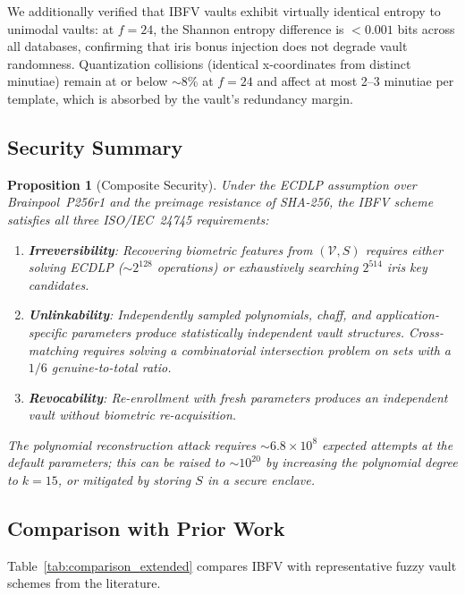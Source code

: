 \documentclass[3p,twocolumn]{elsarticle}
\newtheorem{proposition}{Proposition}
\newcommand{\IBFV}{\textsf{IBFV}}
\begin{document}
We additionally verified that \IBFV{} vaults exhibit virtually identical entropy to unimodal vaults: at $f = 24$, the Shannon entropy difference is $< 0.001$ bits across all databases, confirming that iris bonus injection does not degrade vault randomness. Quantization collisions (identical x-coordinates from distinct minutiae) remain at or below $\sim$8\% at $f = 24$ and affect at most 2--3 minutiae per template, which is absorbed by the vault's redundancy margin.

\subsection{Security Summary}
\label{sec:security_summary}

\begin{proposition}[Composite Security]
Under the ECDLP assumption over Brainpool~P256r1 and the preimage resistance of SHA-256, the \IBFV{} scheme satisfies all three ISO/IEC~24745 requirements:
\begin{enumerate}
    \item \textbf{Irreversibility}: Recovering biometric features from $(\mathcal{V}, S)$ requires either solving ECDLP ($\sim\!2^{128}$ operations) or exhaustively searching $2^{514}$ iris key candidates.
    \item \textbf{Unlinkability}: Independently sampled polynomials, chaff, and application-specific parameters produce statistically independent vault structures. Cross-matching requires solving a combinatorial intersection problem on sets with a $1/6$ genuine-to-total ratio.
    \item \textbf{Revocability}: Re-enrollment with fresh parameters produces an independent vault without biometric re-acquisition.
\end{enumerate}
The polynomial reconstruction attack requires $\sim\!6.8 \times 10^{8}$ expected attempts at the default parameters; this can be raised to $\sim\!10^{20}$ by increasing the polynomial degree to $k = 15$, or mitigated by storing $S$ in a secure enclave.
\end{proposition}

\subsection{Comparison with Prior Work}
\label{sec:comparison}

Table~\ref{tab:comparison_extended} compares \IBFV{} with representative fuzzy vault schemes from the literature.
\end{document}
